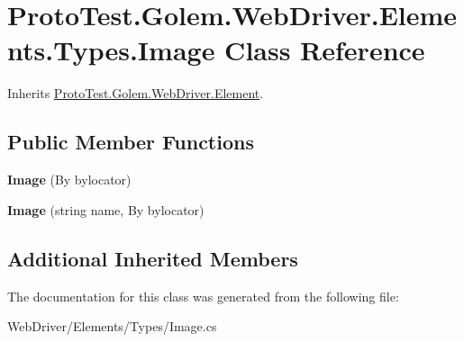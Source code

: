 \hypertarget{class_proto_test_1_1_golem_1_1_web_driver_1_1_elements_1_1_types_1_1_image}{\section{Proto\-Test.\-Golem.\-Web\-Driver.\-Elements.\-Types.\-Image Class Reference}
\label{class_proto_test_1_1_golem_1_1_web_driver_1_1_elements_1_1_types_1_1_image}
}


Inherits \hyperlink{class_proto_test_1_1_golem_1_1_web_driver_1_1_element}{Proto\-Test.\-Golem.\-Web\-Driver.\-Element}.

\subsection*{Public Member Functions}
\begin{DoxyCompactItemize}
\item 
\hypertarget{class_proto_test_1_1_golem_1_1_web_driver_1_1_elements_1_1_types_1_1_image_aa3f6c0a55ed3e5b07307b51952198df7}{{\bfseries Image} (By bylocator)}\label{class_proto_test_1_1_golem_1_1_web_driver_1_1_elements_1_1_types_1_1_image_aa3f6c0a55ed3e5b07307b51952198df7}

\item 
\hypertarget{class_proto_test_1_1_golem_1_1_web_driver_1_1_elements_1_1_types_1_1_image_a209e9ea2f7198f74f465fdc25c210bbc}{{\bfseries Image} (string name, By bylocator)}\label{class_proto_test_1_1_golem_1_1_web_driver_1_1_elements_1_1_types_1_1_image_a209e9ea2f7198f74f465fdc25c210bbc}

\end{DoxyCompactItemize}
\subsection*{Additional Inherited Members}


The documentation for this class was generated from the following file\-:\begin{DoxyCompactItemize}
\item 
Web\-Driver/\-Elements/\-Types/Image.\-cs\end{DoxyCompactItemize}
